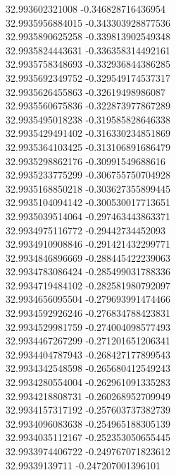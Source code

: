 {32.993602321008	-0.346828716436954\\
32.9935956884015	-0.343303928877536\\
32.9935890625258	-0.339813902549348\\
32.9935824443631	-0.336358314492161\\
32.9935758348693	-0.332936844386285\\
32.9935692349752	-0.329549174537317\\
32.9935626455863	-0.32619498986087\\
32.9935560675836	-0.322873977867289\\
32.9935495018238	-0.319585828646338\\
32.9935429491402	-0.316330234851869\\
32.9935364103425	-0.313106891686479\\
32.9935298862176	-0.30991549688616\\
32.9935233775299	-0.306755750704928\\
32.9935168850218	-0.303627355899445\\
32.9935104094142	-0.300530017713651\\
32.9935039514064	-0.297463443863371\\
32.9934975116772	-0.29442734452093\\
32.9934910908846	-0.291421432299771\\
32.9934846896669	-0.288445422239063\\
32.9934783086424	-0.285499031788336\\
32.9934719484102	-0.282581980792097\\
32.9934656095504	-0.279693991474466\\
32.9934592926246	-0.276834788423831\\
32.9934529981759	-0.274004098577493\\
32.9934467267299	-0.271201651206341\\
32.9934404787943	-0.268427177899543\\
32.9934342548598	-0.265680412549243\\
32.9934280554004	-0.262961091335283\\
32.9934218808731	-0.260268952709949\\
32.9934157317192	-0.257603737382739\\
32.9934096083638	-0.254965188305139\\
32.9934035112167	-0.252353050655445\\
32.9933974406722	-0.249767071823612\\
32.99339139711	-0.247207001396101\\
}

